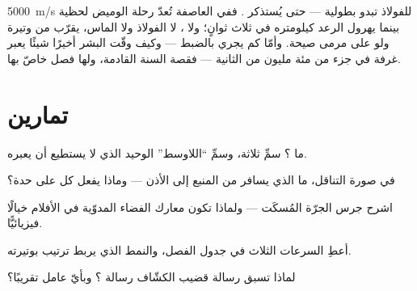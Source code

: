 \begin{remark}\label{rem:g7:sound-production:light}
\qty{5000}{m/s} للفولاذ تبدو بطولية --- حتى يُستذكر . ففي
العاصفة تُعدّ رحلة الوميض لحظية بينما يهرول الرعد كيلومتره في
ثلاث ثوانٍ؛ ولا ، لا الفولاذ ولا الماس، يقرّب  من وتيرة
 ولو على مرمى صيحة. وأمّا كم يجري  بالضبط --- وكيف
وقّت البشر أخيرًا شيئًا يعبر غرفة في جزء من مئة مليون من
الثانية --- فقصة السنة القادمة، ولها فصل خاصّ بها.
\end{remark}

\section{تمارين}

\begin{exercise}[$\star$]\label{exo:g7:sound-production:1}
ما ؟ سمِّ ثلاثة، وسمِّ ``اللاوسط'' الوحيد الذي لا يستطيع
 أن يعبره.
\end{exercise}

\begin{exercise}[$\star$]\label{exo:g7:sound-production:2}
في صورة التناقل، ما الذي يسافر من المنبع إلى الأذن --- وماذا
يفعل كل  على حدة؟
\end{exercise}

\begin{exercise}[$\star$]\label{exo:g7:sound-production:3}
اشرح جرس الجرّة المُسكَت  --- ولماذا تكون معارك الفضاء
المدوّية في الأفلام خيالًا فيزيائيًّا.
\end{exercise}

\begin{exercise}[$\star$]\label{exo:g7:sound-production:4}
أعطِ السرعات الثلاث في جدول الفصل، والنمط الذي يربط ترتيب
  بوتيرته.
\end{exercise}

\begin{exercise}[$\star$]\label{exo:g7:sound-production:5}
لماذا تسبق رسالة قضيب الكشّاف رسالة ؟ وبأيّ عامل تقريبًا؟
\end{exercise}

